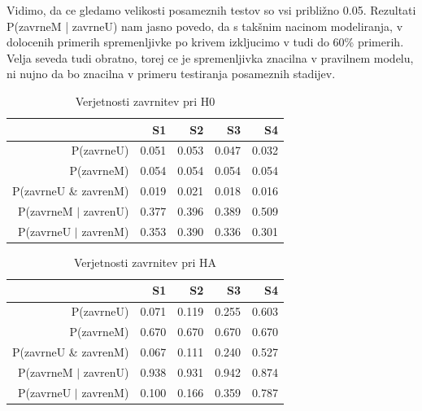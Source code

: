 \documentclass[letterpaper,11pt]{article}
\begin{document}
Vidimo, da ce gledamo velikosti posameznih testov so vsi približno 0.05. Rezultati P(zavrneM | zavrneU) nam jasno povedo, da s takšnim nacinom modeliranja, v dolocenih primerih spremenljivke po krivem izkljucimo v tudi do 60\% primerih. Velja seveda tudi obratno, torej ce je spremenljivka znacilna v pravilnem modelu, ni nujno da bo znacilna v primeru testiranja posameznih stadijev.

\begin{table}[ht]
\centering
\begin{tabular}{rrrrr}
  \hline
 & S1 & S2 & S3 & S4 \\ 
  \hline
P(zavrneU) & 0.051 & 0.053 & 0.047 & 0.032 \\ 
  P(zavrneM) & 0.054 & 0.054 & 0.054 & 0.054 \\ 
  P(zavrneU \& zavrenM) & 0.019 & 0.021 & 0.018 & 0.016 \\ 
  P(zavrneM $|$ zavrenU) & 0.377 & 0.396 & 0.389 & 0.509 \\ 
  P(zavrneU $|$ zavrenM) & 0.353 & 0.390 & 0.336 & 0.301 \\ 
   \hline
\end{tabular}
\caption{Verjetnosti zavrnitev pri H0} 
\label{table:4}
\end{table}

\begin{table}[ht]
\centering
\begin{tabular}{rrrrr}
  \hline
 & S1 & S2 & S3 & S4 \\ 
  \hline
P(zavrneU) & 0.071 & 0.119 & 0.255 & 0.603 \\ 
  P(zavrneM) & 0.670 & 0.670 & 0.670 & 0.670 \\ 
  P(zavrneU \& zavrenM) & 0.067 & 0.111 & 0.240 & 0.527 \\ 
  P(zavrneM $|$ zavrenU) & 0.938 & 0.931 & 0.942 & 0.874 \\ 
  P(zavrneU $|$ zavrenM) & 0.100 & 0.166 & 0.359 & 0.787 \\ 
   \hline
\end{tabular}
\caption{Verjetnosti zavrnitev pri HA} 
\label{table:5}
\end{table}
\end{document}
